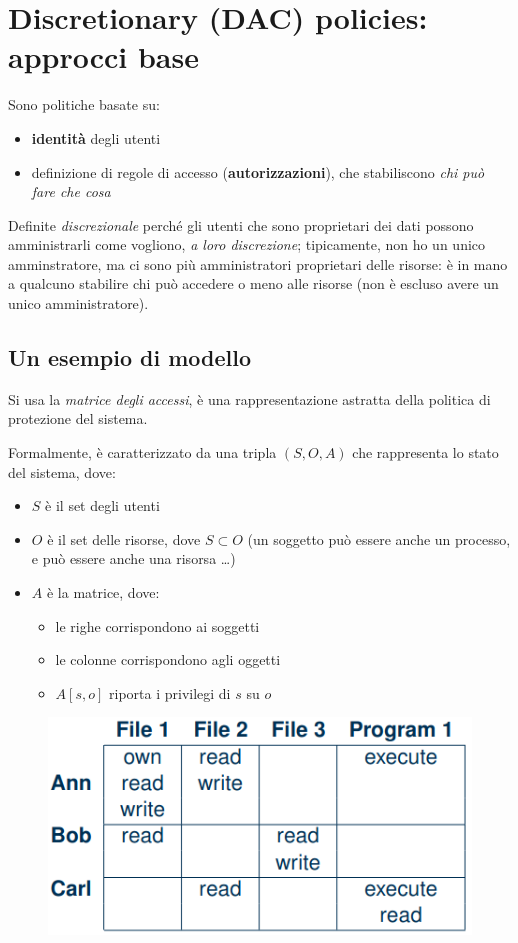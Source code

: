 \documentclass{report}
\begin{document}
\chapter{Discretionary (DAC) policies: approcci base}

\noindent Sono politiche basate su:
\begin{itemize}
    \item \textbf{identità} degli utenti 
    \item definizione di regole di accesso (\textbf{autorizzazioni}), che stabiliscono
    \textit{chi può fare che cosa}
\end{itemize}

\noindent Definite \textit{discrezionale} perché gli utenti che sono proprietari 
dei dati possono amministrarli come vogliono, \textit{a loro discrezione}; tipicamente, 
non ho un unico amminstratore, ma ci sono più amministratori proprietari delle risorse: è 
in mano a qualcuno stabilire chi può accedere o meno alle risorse (non è escluso avere 
un unico amministratore).

\section{Un esempio di modello}
Si usa la \textit{matrice degli accessi}, è una rappresentazione astratta della 
politica di protezione del sistema.

\noindent Formalmente, è caratterizzato da una tripla $(S, O, A)$ che rappresenta 
lo stato del sistema, dove:
\begin{itemize}
    \item $S$ è il set degli utenti 
    \item $O$ è il set delle risorse, dove $S \subset O$ (un soggetto può essere anche un processo, e può 
    essere anche una risorsa \dots)
    \item $A$ è la matrice, dove:
    \begin{itemize}
        \item le righe corrispondono ai soggetti 
        \item le colonne corrispondono agli oggetti 
        \item $A[s, o]$ riporta i privilegi di $s$ su $o$
    \end{itemize}
\end{itemize}

\begin{figure}[H]
    \centering
    \includegraphics[width=0.6\linewidth]{images/dac1.png}
\end{figure}
\end{document}
